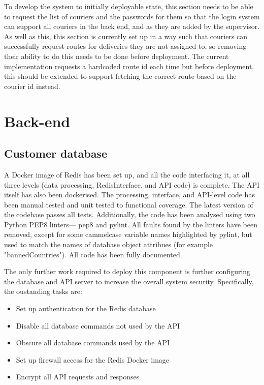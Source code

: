 To develop the system to initially deployable state, this section needs to be able to request the list of couriers and the passwords for them so that the login system can support all couriers in the back end, and as they are added by the supervisor. As well as this, this section is currently set up in a way such that couriers can successfully request routes for deliveries they are not assigned to, so removing their ability to do this needs to be done before deployment. The current implementation requests a hardcoded route id each time but before deployment, this should be extended to support fetching the correct route based on the courier id instead.
\section{Back-end}
\subsection{Customer database}
A Docker image of Redis has been set up, and all the code interfacing it, at all three levels (data processing, RedisInterface, and API code) is complete. The API itself has also been dockerised. The processing, interface, and API-level code has been manual tested and unit tested to functional coverage. The latest version of the codebase passes all tests. Additionally, the code has been analysed using two Python PEP8 linters--- pep8 and pylint. All faults found by the linters have been removed, except for some cammelcase variable names highlighted by pylint, but used to match the names of database object attribues (for example "bannedCountries"). All code has been fully documented.

The only further work required to deploy this component is further configuring the database and API server to increase the overall system security. Specifically, the oustanding tasks are:

\begin{itemize}
    \item Set up authentication for the Redis database
    \item Disable all database commands not used by the API
    \item Obscure all database commands used by the API
    \item Set up firewall access for the Redis Docker image
    \item Encrypt all API requests and responses
\end{itemize}

